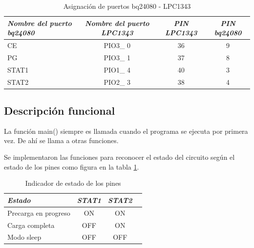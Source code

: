 {\begin{table}[ht]
	\centering
	\caption{Asignación de puertos bq24080 - LPC1343}
	\begin{tabular}{@{} l *3c @{}}    \toprule
		\emph{\textbf{Nombre del puerto bq24080}} & \emph{\textbf{Nombre del puerto LPC1343}} & \emph{\textbf{PIN LPC1343}} & \emph{\textbf{PIN bq24080}}\\
		\midrule
		CE &  PIO3\_ 0 & 36 & 9	\\	
		PG	&  PIO3\_ 1 & 37 & 8\\
		STAT1 &  PIO1\_ 4 & 40 & 3\\
		STAT2 &  PIO2\_ 3 & 38 & 4\\

		\bottomrule
		\hline
	\end{tabular}
	\label{tab:bq}
\end{table}




\subsection{Descripción funcional}
\label{subsec:func} 
La función main() siempre es llamada cuando el programa se ejecuta por primera vez. De ahí se llama a otras funciones.

Se implementaron las funciones para reconocer el estado del circuito según el estado de los pines como figura en la tabla \ref{tab:bq}.

\begin{table}[ht]
	\centering
	\caption{Indicador de estado de los pines}
	\begin{tabular}{@{} l *3c @{}}    \toprule
		\emph{\textbf{Estado}} & \emph{\textbf{STAT1}} & \emph{\textbf{STAT2}}\\
		\midrule
		Precarga en progreso &  ON & ON \\	
		Carga completa &  OFF & ON \\
		Modo sleep &  OFF & OFF \\
		\bottomrule
		\hline
	\end{tabular}
	\label{tab:STAT}
\end{table}

}
